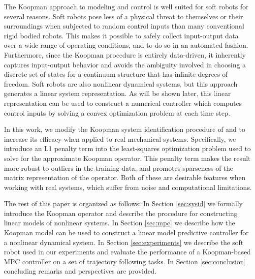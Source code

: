 The Koopman approach to modeling and control is well suited for soft robots for several reasons.
Soft robots pose less of a physical threat to themselves or their surroundings when subjected to random control inputs than many conventional rigid bodied robots. 
This makes it possible to safely collect input-output data over a wide range of operating conditions, and to do so in an automated fashion. 
Furthermore, since the Koopman procedure is entirely data-driven, it inherently captures input-output behavior and avoids the ambiguity involved in choosing a discrete set of states for a continuum structure that has infinite degrees of freedom.
Soft robots are also nonlinear dynamical systems, but this approach generates a linear system representation.
As will be shown later, this linear representation can be used to construct a numerical controller which computes control inputs by solving a convex optimization problem at each time step.

In this work, we modify the Koopman system identification procedure of \citet{mauroy2016linear} and \citet{korda2018linear} to increase its efficacy when applied to real mechanical systems.
Specifically, we introduce an L1 penalty term into the least-squares optimization problem used to solve for the approximate Koopman operator.
This penalty term makes the result more robust to outliers in the training data, and promotes sparseness of the matrix representation of the operator.
Both of these are desirable features when working with real systems, which suffer from noise and computational limitations.




The rest of this paper is organized as follows:
In Section \ref{sec:sysid} we formally introduce the Koopman operator and describe the procedure for constructing linear models of nonlinear systems. 
In Section \ref{sec:mpc} we describe how the Koopman model can be used to construct a linear model predictive controller for a nonlinear dynamical system.
In Section \ref{sec:experiments} we describe the soft robot used in our experiments and evaluate the performance of a Koopman-based MPC controller on a set of trajectory following tasks.
In Section \ref{sec:conclusion} concluding remarks and perspectives are provided.





